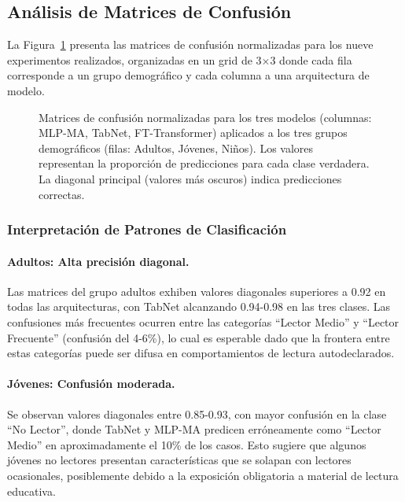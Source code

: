 \documentclass[12pt,a4paper]{article}
\begin{document}
\subsection{Análisis de Matrices de Confusión}

La Figura~\ref{fig:confusion_matrices} presenta las matrices de confusión normalizadas para los nueve experimentos realizados, organizadas en un grid de 3×3 donde cada fila corresponde a un grupo demográfico y cada columna a una arquitectura de modelo.

\begin{figure}[H]
\centering
{}
\caption{Matrices de confusión normalizadas para los tres modelos (columnas: MLP-MA, TabNet, FT-Transformer) aplicados a los tres grupos demográficos (filas: Adultos, Jóvenes, Niños). Los valores representan la proporción de predicciones para cada clase verdadera. La diagonal principal (valores más oscuros) indica predicciones correctas.}
\label{fig:confusion_matrices}
\end{figure}

\subsubsection{Interpretación de Patrones de Clasificación}

\paragraph{Adultos: Alta precisión diagonal.} Las matrices del grupo adultos exhiben valores diagonales superiores a 0.92 en todas las arquitecturas, con TabNet alcanzando 0.94-0.98 en las tres clases. Las confusiones más frecuentes ocurren entre las categorías ``Lector Medio'' y ``Lector Frecuente'' (confusión del 4-6\%), lo cual es esperable dado que la frontera entre estas categorías puede ser difusa en comportamientos de lectura autodeclarados.

\paragraph{Jóvenes: Confusión moderada.} Se observan valores diagonales entre 0.85-0.93, con mayor confusión en la clase ``No Lector'', donde TabNet y MLP-MA predicen erróneamente como ``Lector Medio'' en aproximadamente el 10\% de los casos. Esto sugiere que algunos jóvenes no lectores presentan características que se solapan con lectores ocasionales, posiblemente debido a la exposición obligatoria a material de lectura educativa.
\end{document}
